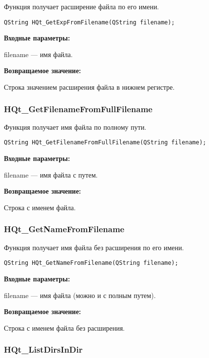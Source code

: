 \documentclass[a4paper,12pt]{article}
\begin{document}
Функция получает расширение файла по его имени.


\begin{lstlisting}[label=code_syntax_HQt_GetExpFromFilename,caption=Синтаксис]
QString HQt_GetExpFromFilename(QString filename);
\end{lstlisting}

\textbf{Входные параметры:}
 
filename --- имя файла.

\textbf{Возвращаемое значение:}

Строка значением расширения файла в нижнем регистре.


\subsubsection{HQt\_GetFilenameFromFullFilename}\label{HQt_GetFilenameFromFullFilename}

Функция получает имя файла по полному пути.


\begin{lstlisting}[label=code_syntax_HQt_GetFilenameFromFullFilename,caption=Синтаксис]
QString HQt_GetFilenameFromFullFilename(QString filename);
\end{lstlisting}

\textbf{Входные параметры:}
 
filename --- имя файла с путем.

\textbf{Возвращаемое значение:}

Строка с именем файла.


\subsubsection{HQt\_GetNameFromFilename}\label{HQt_GetNameFromFilename}

Функция получает имя файла без расширения по его имени.


\begin{lstlisting}[label=code_syntax_HQt_GetNameFromFilename,caption=Синтаксис]
QString HQt_GetNameFromFilename(QString filename);
\end{lstlisting}

\textbf{Входные параметры:}

filename --- имя файла (можно и с полным путем).

\textbf{Возвращаемое значение:}

Строка с именем файла без расширения.


\subsubsection{HQt\_ListDirsInDir}\label{HQt_ListDirsInDir}
\end{document}
